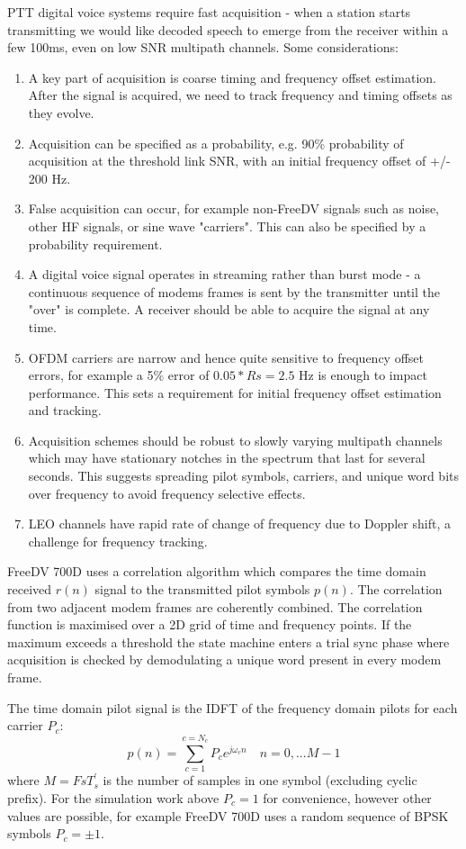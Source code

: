 \documentclass{article}
\begin{document}
PTT digital voice systems require fast acquisition - when a station starts transmitting we would like decoded speech to emerge from the receiver within a few 100ms, even on low SNR multipath channels.  Some considerations:
\begin{enumerate}
\item A key part of acquisition is coarse timing and frequency offset estimation.  After the signal is acquired, we need to track frequency and timing offsets as they evolve.
\item Acquisition can be specified as a probability, e.g. 90\% probability of acquisition at the threshold link SNR, with an initial frequency offset of +/- 200 Hz.
\item False acquisition can occur, for example non-FreeDV signals such as noise, other HF signals, or sine wave "carriers". This can also be specified by a probability requirement. 
\item A digital voice signal operates in streaming rather than burst mode - a continuous sequence of modems frames is sent by the transmitter until the "over" is complete.  A receiver should be able to acquire the signal at any time.
\item OFDM carriers are narrow and hence quite sensitive to frequency offset errors, for example a 5\% error of $0.05*Rs=2.5$ Hz is enough to impact performance. This sets a requirement for initial frequency offset estimation and tracking.
\item Acquisition schemes should be robust to slowly varying multipath channels which may have stationary notches in the spectrum that last for several seconds.  This suggests spreading pilot symbols, carriers, and unique word bits over frequency to avoid frequency selective effects.
\item LEO channels have rapid rate of change of frequency due to Doppler shift, a challenge for frequency tracking.
\end{enumerate}

FreeDV 700D uses a correlation algorithm which compares the time domain received $r(n)$ signal to the transmitted pilot symbols $p(n)$.  The correlation from two adjacent modem frames are coherently combined.  The correlation function is maximised over a 2D grid of time and frequency points.  If the maximum exceeds a threshold the state machine enters a trial sync phase where acquisition is checked by demodulating a unique word present in every modem frame.

The time domain pilot signal is the IDFT of the frequency domain pilots for each carrier $P_c$:
\begin{equation}
p(n) = \sum^{c=N_c}_{c=1} P_c e^{j \omega_c n } \quad n=0,...M-1
\end{equation}
where $M=FsT^\prime_s$ is the number of samples in one symbol (excluding cyclic prefix). For the simulation work above $P_c=1$ for convenience, however other values are possible, for example FreeDV 700D uses a random sequence of BPSK symbols $P_c= \pm 1$.
\end{document}
